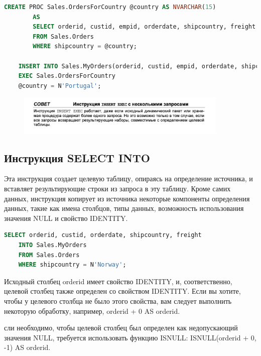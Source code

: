 \begin{lstlisting}[label=lst:funcReturn, language=sql]
	CREATE PROC Sales.OrdersForCountry @country AS NVARCHAR(15)
		AS
		SELECT orderid, custid, empid, orderdate, shipcountry, freight
		FROM Sales.Orders
		WHERE shipcountry = @country;

	INSERT INTO Sales.MyOrders(orderid, custid, empid, orderdate, shipcountry, freight)
 	EXEC Sales.OrdersForCountry
 	@country = N'Portugal';
\end{lstlisting}

\begin{figure}[h!]
	\begin{center}
		\includegraphics[width=0.9\textwidth]{img/advice21.png}
	\end{center}
	\captionsetup{justification=centering}
\end{figure}


\subsection{Инструкция SELECT INTO}

Эта инструкция создает целевую таблицу, опираясь на определение источника, и вставляет результирующие строки из запроса в эту таблицу.
Кроме самих данных, инструкция копирует из источника некоторые компоненты
определения данных, такие как имена столбцов, типы данных, возможность использования значения NULL и свойство IDENTITY.

\begin{lstlisting}[label=lst:funcReturn, language=sql]
	SELECT orderid, custid, orderdate, shipcountry, freight
	INTO Sales.MyOrders
	FROM Sales.Orders
	WHERE shipcountry = N'Norway';
\end{lstlisting}

Исходный столбец orderid имеет свойство IDENTITY, и, соответственно,
целевой столбец также определен со свойством IDENTITY. Если вы хотите, чтобы у целевого столбца не было этого свойства, вам следует выполнить некоторую обработку, например, orderid + 0 AS orderid.

сли необходимо, чтобы целевой столбец был определен как недопускающий значения NULL, требуется использовать функцию ISNULL: ISNULL(orderid + 0, -1) AS
orderid. 

